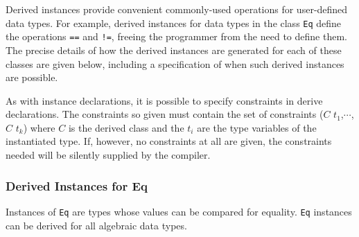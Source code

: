 Derived instances provide convenient commonly-used operations for user-defined data types.
For example, derived instances for data types in the class \texttt{Eq} define the operations \texttt{==} and \texttt{!=}, freeing the programmer from the need to define them. The precise details of how
the derived instances are generated for each of these classes are given below,
including a specification of when such derived instances are possible.


As with instance declarations, it is possible to specify constraints in derive declarations. The constraints so given must contain the set of constraints  ($C$ $t_1$,$\cdots$, $C$ $t_k$) where $C$ is the derived class and  the $t_i$ are the type variables of the instantiated type. If, however, no constraints at all are given, the constraints needed will be silently supplied by the compiler.

\subsubsection{Derived Instances for Eq}

Instances of \texttt{Eq} are types whose values can be compared for equality. \texttt{Eq} instances can be derived for all algebraic data types.

